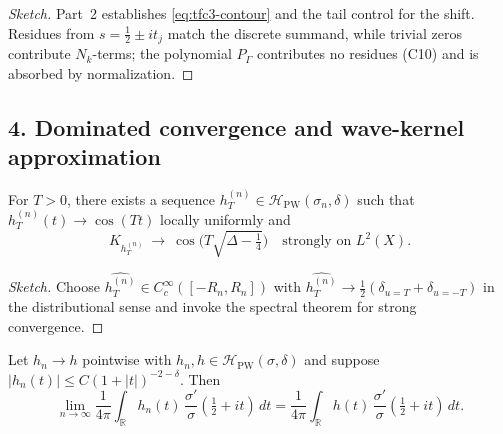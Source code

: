 \begin{proof}[Sketch]\relax\hspace{0pt}
Part~2 establishes \eqref{eq:tfc3-contour} and the tail control for the shift. Residues from $s=\tfrac12\pm it_j$ match the discrete summand, while trivial zeros contribute $N_k$-terms; the polynomial $P_\Gamma$ contributes no residues (C10) and is absorbed by normalization.\relax\hspace{0pt}
\end{proof}

\subsection*{4. Dominated convergence and wave-kernel approximation}\relax\hspace{0pt}
\label{subsec:tfc3-DC} %

\begin{lemma}\relax\hspace{0pt}
\label{lem:tfc3-wave-approx} %
For $T>0$, there exists a sequence $h_T^{(n)}\in\mathcal{H}_{\mathrm{PW}}(\sigma_n,\delta)$ such that $h_T^{(n)}(t)\to \cos(Tt)$ locally uniformly and
\[
K_{h_T^{(n)}}\ \to\ \cos\!\big(T\sqrt{\Delta-\tfrac14}\big) \quad\text{strongly on }L^2(X).
\]
\end{lemma}

\begin{proof}[Sketch]\relax\hspace{0pt}
Choose $\widehat{h_T^{(n)}}\in C_c^\infty([-R_n,R_n])$ with $\widehat{h_T^{(n)}}\to \tfrac12(\delta_{u=T}+\delta_{u=-T})$ in the distributional sense and invoke the spectral theorem for strong convergence.\relax\hspace{0pt}
\end{proof}

\begin{proposition}\relax\hspace{0pt}
\label{prop:tfc3-DC} %
Let $h_n\to h$ pointwise with $h_n,h\in\mathcal{H}_{\mathrm{PW}}(\sigma,\delta)$ and suppose $|h_n(t)|\le C(1+|t|)^{-2-\delta}$. Then
\[
\lim_{n\to\infty} \frac{1}{4\pi}\int_{\mathbb{R}} h_n(t)\,\frac{\sigma'}{\sigma}\!\left(\tfrac12+it\right)\,dt
=\frac{1}{4\pi}\int_{\mathbb{R}} h(t)\,\frac{\sigma'}{\sigma}\!\left(\tfrac12+it\right)\,dt.
\]
\end{proposition}


